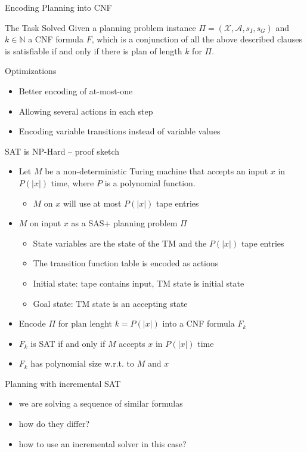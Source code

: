\documentclass[t]{sdqbeamer}
\begin{document}
\begin{frame}{Encoding Planning into CNF}
\begin{block}{The Task Solved}
Given a planning problem instance $\Pi = (\mathcal{X}, \mathcal{A}, s_I, s_G)$ and $k\in \mathbb{N}$
a CNF formula $F$, which is a conjunction of all the above described clauses is satisfiable if and only if there is plan of length $k$ for $\Pi$.
\end{block}
Optimizations
\begin{itemize}
\item Better encoding of at-most-one
\item Allowing several actions in each step
\item Encoding variable transitions instead of variable values
\end{itemize}
\end{frame}

\begin{frame}{SAT is NP-Hard -- proof sketch}
\begin{itemize}
	\item Let $M$ be a non-deterministic Turing machine that accepts an input $x$ in $P(|x|)$ time,
	where $P$ is a polynomial function.
	\begin{itemize}
	\item $M$ on $x$ will use at most $P(|x|)$ tape entries
	\end{itemize}
	\item $M$ on input $x$ as a SAS+ planning problem $\Pi$
	\begin{itemize}
	\item State variables are the state of the TM and the  $P(|x|)$ tape entries
	\item The transition function table is encoded as actions
	\item Initial state: tape contains input, TM state is initial state
	\item Goal state: TM state is an accepting state
	\end{itemize}
	\item Encode $\Pi$ for plan lenght $k=P(|x|)$ into a CNF formula $F_k$
	\item $F_k$ is SAT if and only if $M$ accepts $x$ in $P(|x|)$ time
	\item $F_k$ has polynomial size w.r.t. to $M$ and $x$
\end{itemize}
\end{frame}


\begin{frame}{Planning with incremental SAT}
\begin{itemize}
	\item we are solving a sequence of similar formulas
	\item how do they differ?
	\item how to use an incremental solver in this case?
\end{itemize}
\end{frame}
\end{document}
